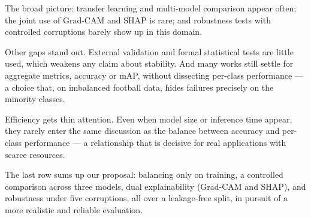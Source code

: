 \documentclass[preprint,12pt]{elsarticle}
\begin{document}
The broad picture: transfer learning and multi-model comparison appear often; the joint use of Grad-CAM and SHAP is rare; and robustness tests with controlled corruptions barely show up in this domain.

Other gaps stand out. External validation and formal statistical tests are little used, which weakens any claim about stability. And many works still settle for aggregate metrics, accuracy or mAP, without dissecting per-class performance --- a choice that, on imbalanced football data, hides failures precisely on the minority classes.

Efficiency gets thin attention. Even when model size or inference time appear, they rarely enter the same discussion as the balance between accuracy and per-class performance --- a relationship that is decisive for real applications with scarce resources.

The last row sums up our proposal: balancing only on training, a controlled comparison across three models, dual explainability (Grad-CAM and SHAP), and robustness under five corruptions, all over a leakage-free split, in pursuit of a more realistic and reliable evaluation.
\end{document}
